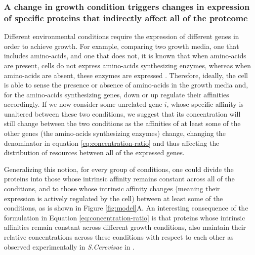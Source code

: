 \subsubsection{A change in growth condition triggers changes in expression of specific proteins that indirectly affect all of the proteome}
Different environmental conditions require the expression of different genes in order to achieve growth.
For example, comparing two growth media, one that includes amino-acids, and one that does not, it is known that when amino-acids are present, cells do not express amino-acids synthesizing enzymes, whereas when amino-acids are absent, these enzymes are expressed \cite{24656150}.
Therefore, ideally, the cell is able to sense the presence or absence of amino-acids in the growth media and, for the amino-acids synthesizing genes, down or up regulate their affinities accordingly.
If we now consider some unrelated gene $i$, whose specific affinity is unaltered between these two conditions, we suggest that its concentration will still change between the two conditions as the affinities of at least some of the other genes (the amino-acids synthesizing enzymes) change, changing the denominator in equation \ref{eq:concentration-ratio} and thus affecting the distribution of resources between all of the expressed genes.


Generalizing this notion, for every group of conditions, one could divide the proteins into those whose intrinsic affinity remains constant across all of the conditions, and to those whose intrinsic affinity changes (meaning their expression is actively regulated by the cell) between at least some of the conditions, as is shown in Figure \ref{fig:model}A.
An interesting consequence of the formulation in Equation \ref{eq:concentration-ratio} is that proteins whose intrinsic affinities remain constant across different growth conditions, also maintain their relative concentrations across these conditions with respect to each other as observed experimentally in \emph{S.Cerevisae} in \cite{Keren2013}.